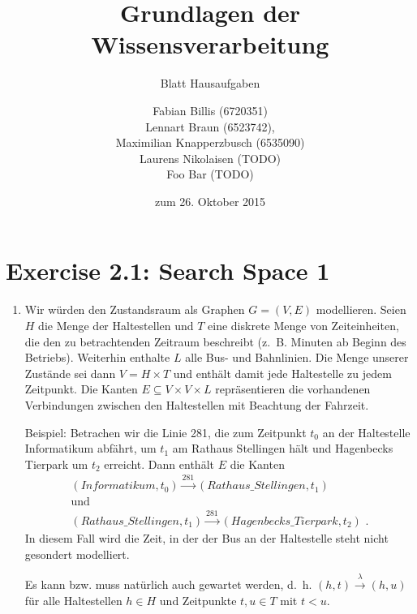 \documentclass[a4paper]{scrartcl}
\title{Grundlagen der Wissensverarbeitung}
\subtitle{Blatt {\blattnr} Hausaufgaben}
\author{
    Fabian Billis (6720351) \\
    Lennart Braun (6523742), \\
    Maximilian Knapperzbusch (6535090) \\
    Laurens Nikolaisen (TODO) \\
    Foo Bar (TODO)
}
\date{zum 26. Oktober 2015}
\def \blattnr {2}
\begin{document}
\maketitle

\section*{Exercise \blattnr.1: Search Space 1}
\begin{enumerate}
    \item
        Wir würden den Zustandsraum als Graphen $G = (V,E)$ modellieren.
        Seien $H$ die Menge der Haltestellen und $T$ eine diskrete Menge von
        Zeiteinheiten, die den zu betrachtenden Zeitraum beschreibt (z.~B.
        Minuten ab Beginn des Betriebs). Weiterhin enthalte $L$ alle Bus- und
        Bahnlinien.
        Die Menge unserer Zustände sei dann $V = H \times T$ und enthält damit
        jede Haltestelle zu jedem Zeitpunkt.
        Die Kanten $E \subseteq V \times V \times L$ repräsentieren die
        vorhandenen Verbindungen zwischen den Haltestellen mit Beachtung der
        Fahrzeit.

        Beispiel:
        Betrachen wir die Linie 281, die zum Zeitpunkt $t_0$ an der Haltestelle
        Informatikum abfährt, um $t_1$ am Rathaus Stellingen hält und
        Hagenbecks Tierpark um $t_2$ erreicht. Dann enthält $E$ die Kanten
        \begin{gather*}
            (Informatikum, t_0) \overset{281}{\to} (Rathaus\_Stellingen, t_1) \\
        \text{und} \\
        (Rathaus\_Stellingen, t_1) \overset{281}{\to} (Hagenbecks\_Tierpark, t_2)
        \text{ .}
        \end{gather*}
        In diesem Fall wird die Zeit, in der der Bus an der Haltestelle steht
        nicht gesondert modelliert.

        Es kann bzw. muss natürlich auch gewartet werden, d.~h. $(h,t)
        \overset{\lambda}{\to} (h, u)$ für alle Haltestellen $h \in H$ und
        Zeitpunkte $t,u \in T$ mit $t < u$.


\end{enumerate}
\end{document}
